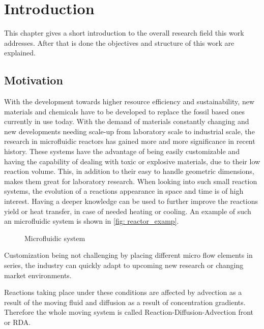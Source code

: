 \documentclass[../thesis.tex]{subfiles}
\begin{document}
\chapter{Introduction}
\label{chp:introduction}

This chapter gives a short introduction to the overall research field this work addresses. After that is done the objectives and structure of this work are explained.

\section{Motivation}

With the development towards higher resource efficiency and sustainability, new materials and chemicals have to be developed to replace the fossil based ones currently in use today. With the demand of materials constantly changing and new developments needing scale-up from laboratory scale to industrial scale, the research in microfluidic reactors has gained more and more significance in recent history. These systems have the advantage of being easily customizable and having the capability of dealing with toxic or explosive materials, due to their low reaction volume. This, in addition to their easy to handle geometric dimensions, makes them great for laboratory research. When looking into such small reaction systems, the evolution of a reactions appearance in space and time is of high interest. Having a deeper knowledge can be used to further improve the reactions yield or heat transfer, in case of needed heating or cooling. An example of such an microfluidic system is shown in \autoref{fig: reactor_examp}.
\begin{figure}[htb]
	\centering
	\qquad
	\caption{Microfluidic system \cite{corning}}%
	\label{fig: reactor_examp}%
\end{figure}
Customization being not challenging by placing different micro flow elements in series, the industry can quickly adapt to upcoming new research or changing market environments.

Reactions taking place under these conditions are affected by advection as a result of the moving fluid and diffusion as a result of concentration gradients. Therefore the whole moving system is called Reaction-Diffusion-Advection front or RDA.
\end{document}
